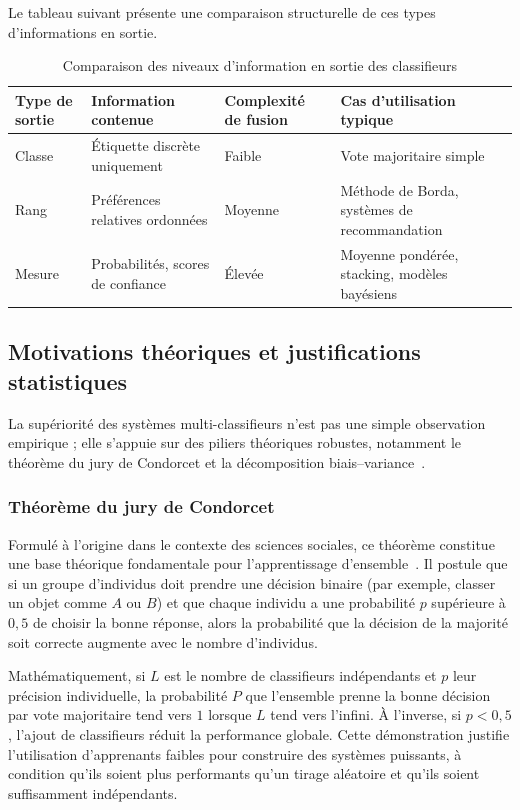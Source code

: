 Le tableau suivant présente une comparaison structurelle de ces types d'informations en sortie.

\begin{table}[h]
  \centering
  \caption{Comparaison des niveaux d'information en sortie des classifieurs}
    \small
    \begin{tabularx}{\textwidth}{lXlX}
    \toprule
    Type de sortie & Information contenue & Complexité de fusion & Cas d'utilisation typique \\
    \midrule
    Classe   & Étiquette discrète uniquement      & Faible  & Vote majoritaire simple \\
    Rang     & Préférences relatives ordonnées    & Moyenne & Méthode de Borda, systèmes de recommandation \\
    Mesure   & Probabilités, scores de confiance  & Élevée  & Moyenne pondérée, stacking, modèles bayésiens \\
    \bottomrule
  \end{tabularx}
\end{table}

\subsection{Motivations théoriques et justifications statistiques}

La supériorité des systèmes multi-classifieurs n'est pas une simple observation empirique ; elle
s'appuie sur des piliers théoriques robustes, notamment le théorème du jury de Condorcet et
la décomposition biais--variance~\cite{turing_ensemble_learning,analyticsvidhya_ensemble_learning,gfg_ensemble_learning}.

\subsubsection{Théorème du jury de Condorcet}

Formulé à l'origine dans le contexte des sciences sociales, ce théorème constitue une base
théorique fondamentale pour l'apprentissage d'ensemble~\cite{wikip_jury_theorem,cmu_ensembles_pdf}. Il postule que si un groupe
d'individus doit prendre une décision binaire (par exemple, classer un objet comme $A$ ou $B$)
et que chaque individu a une probabilité $p$ supérieure à $0{,}5$ de choisir la bonne réponse,
alors la probabilité que la décision de la majorité soit correcte augmente avec le nombre
d'individus.

Mathématiquement, si $L$ est le nombre de classifieurs indépendants et $p$ leur précision
individuelle, la probabilité $P$ que l'ensemble prenne la bonne décision par vote majoritaire
tend vers $1$ lorsque $L$ tend vers l'infini. À l'inverse, si $p < 0{,}5$, l'ajout de classifieurs réduit
la performance globale. Cette démonstration justifie l'utilisation d'\og apprenants faibles \fg{}
pour construire des systèmes puissants, à condition qu'ils soient plus performants qu'un tirage
aléatoire et qu'ils soient suffisamment indépendants.

